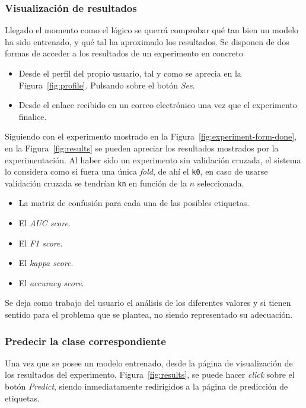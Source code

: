 \subsubsection{Visualización de resultados}
Llegado el momento como el lógico se querrá comprobar qué tan bien un modelo ha sido entrenado, y qué tal ha aproximado los resultados. Se disponen de dos formas de acceder a los resultados de un experimento en concreto

\begin{itemize}
\item Desde el perfil del propio usuario, tal y como se aprecia en la Figura~\ref{fig:profile}. Pulsando sobre el botón \textit{See}.
\item Desde el enlace recibido en un correo electrónico una vez que el experimento finalice.
\end{itemize}


Siguiendo con el experimento mostrado en la Figura~\ref{fig:experiment-form-done}, en la Figura~\ref{fig:results} se pueden apreciar los resultados mostrados por la experimentación. Al haber sido un experimento sin validación cruzada, el sistema lo considera como si fuera una única \textit{fold}, de ahí el \texttt{k0}, en caso de usarse validación cruzada se tendrían \texttt{kn} en función de la $n$ seleccionada.

\begin{itemize}
\item La matriz de confusión para cada una de las posibles etiquetas.
\item El \textit{AUC score}.
\item El \textit{F1 score}.
\item El \textit{kappa score}.
\item El \textit{accuracy score}.
\end{itemize}

Se deja como trabajo del usuario el análisis de los diferentes valores y si tienen sentido para el problema que se plantea, no siendo representado su adecuación.


\subsubsection{Predecir la clase correspondiente}
Una vez que se posee un modelo entrenado, desde la página de visualización de los resultados del experimento, Figura~\ref{fig:results}, se puede hacer \textit{click} sobre el botón \textit{Predict}, siendo inmediatamente redirigidos a la página de predicción de etiquetas.

